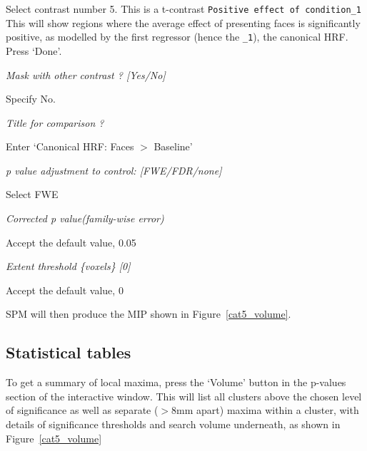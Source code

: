 \bi
\item{Select contrast number 5. This is a t-contrast \verb!Positive effect of condition_1! This will show regions where the average effect of presenting faces is significantly positive, as modelled by the first regressor (hence the \verb!_1!), the canonical HRF. Press `Done'.}
\item{\em Mask with other contrast ? [Yes/No]}
\item{Specify No.}
\item{\em Title for comparison ?}
\item{Enter `Canonical HRF: Faces $>$ Baseline'}
\item{\em p value adjustment to control: [FWE/FDR/none]}
\item{Select FWE}
\item{\em Corrected p value(family-wise error)}
\item{Accept the default value, 0.05}
\item{\em Extent threshold \{voxels\} [0]}
\item{Accept the default value, 0}
\ei

SPM will then produce the MIP shown in Figure~\ref{cat5_volume}.

\subsection{Statistical tables}

To get a summary of local maxima, press the `Volume' button in the p-values section of the interactive window. This will list all clusters above the chosen level of significance as well as separate ($>$8mm apart) maxima within a cluster, with details of significance thresholds and search volume underneath, as shown in Figure~\ref{cat5_volume}

